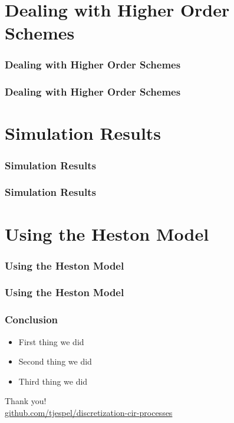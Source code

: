 \documentclass[12pt]{beamer}
\begin{document}
\section{Dealing with Higher Order Schemes}
\frame{\tableofcontents[currentsection]}

\begin{frame}
\frametitle{Dealing with Higher Order Schemes}
\end{frame}

\begin{frame}
\frametitle{Dealing with Higher Order Schemes}
\end{frame}





\section{Simulation Results}
\frame{\tableofcontents[currentsection]}

\begin{frame}
\frametitle{Simulation Results}
\end{frame}

\begin{frame}
\frametitle{Simulation Results}
\end{frame}



\section{Using the Heston Model}
\frame{\tableofcontents[currentsection]}

\begin{frame}
\frametitle{Using the Heston Model}
\end{frame}

\begin{frame}
\frametitle{Using the Heston Model}
\end{frame}





\begin{frame}
\frametitle{Conclusion}
\begin{itemize}
  \item First thing we did
  \item Second thing we did
  \item Third thing we did
\end{itemize}
\end{frame}


\begin{frame}
\centering
{\Large Thank you!}
\\[1cm]
{\small\url{github.com/tjespel/discretization-cir-processes}}
\end{frame}
\end{document}
